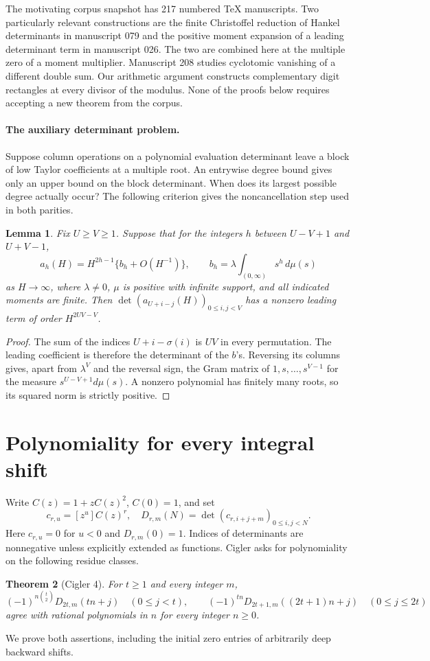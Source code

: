 \documentclass[11pt,a4paper]{article}
\newtheorem{theorem}{Theorem}[section]\newtheorem{lemma}[theorem]{Lemma}
\theoremstyle{definition}\newtheorem{problem}[theorem]{Auxiliary problem}
\theoremstyle{remark}\newtheorem*{remark}{Remark}
\begin{document}
The motivating corpus snapshot \cite{Corpus} has 217 numbered TeX manuscripts. Two particularly relevant constructions are the finite Christoffel reduction of Hankel determinants in manuscript 079 and the positive moment expansion of a leading determinant term in manuscript 026. The two are combined here at the multiple zero of a moment multiplier. Manuscript 208 studies cyclotomic vanishing of a different double sum. Our arithmetic argument constructs complementary digit rectangles at every divisor of the modulus. None of the proofs below requires accepting a new theorem from the corpus.

\paragraph{The auxiliary determinant problem.}
Suppose column operations on a polynomial evaluation determinant leave a block of low Taylor coefficients at a multiple root. An entrywise degree bound gives only an upper bound on the block determinant. When does its largest possible degree actually occur? The following criterion gives the noncancellation step used in both parities.

\begin{lemma}\label{lem:leading}
Fix $U\ge V\ge1$. Suppose that for the integers $h$ between $U-V+1$ and $U+V-1$,
\[
 a_h(H)=H^{2h-1}\{b_h+O(H^{-1})\},\qquad
 b_h=\lambda\int_{(0,\infty)}s^{h}\,d\mu(s)
\]
as $H\to\infty$, where $\lambda\ne0$, $\mu$ is positive with infinite support, and all indicated moments are finite. Then $\det(a_{U+i-j}(H))_{0\le i,j<V}$ has a nonzero leading term of order $H^{2UV-V}$.
\end{lemma}
\begin{proof}
The sum of the indices $U+i-\sigma(i)$ is $UV$ in every permutation. The leading coefficient is therefore the determinant of the $b$'s. Reversing its columns gives, apart from $\lambda^V$ and the reversal sign, the Gram matrix of $1,s,\dots,s^{V-1}$ for the measure $s^{U-V+1}d\mu(s)$. A nonzero polynomial has finitely many roots, so its squared norm is strictly positive.
\end{proof}


\section{Polynomiality for every integral shift}
Write $C(z)=1+zC(z)^2$, $C(0)=1$, and set
\[
c_{r,u}=[z^u]C(z)^r,\quad
D_{r,m}(N)=\det(c_{r,i+j+m})_{0\le i,j<N}.
\]
Here $c_{r,u}=0$ for $u<0$ and $D_{r,m}(0)=1$. Indices of determinants are nonnegative unless explicitly extended as functions. Cigler \cite[Conj.~4, eqs.~(16)--(17)]{Cig} asks for polynomiality on the following residue classes. \begin{theorem}[Cigler 4]\label{result:allshift} For $t\ge1$ and every integer $m$,
\[
(-1)^{n\binom t2}D_{2t,m}(tn+j)\quad(0\le j<t),\qquad
(-1)^{tn}D_{2t+1,m}((2t+1)n+j)\quad(0\le j\le2t)
\]
agree with rational polynomials in $n$ for every integer $n\ge0$.
\end{theorem}
We prove both assertions, including the initial zero entries of arbitrarily deep backward shifts.
\end{document}
